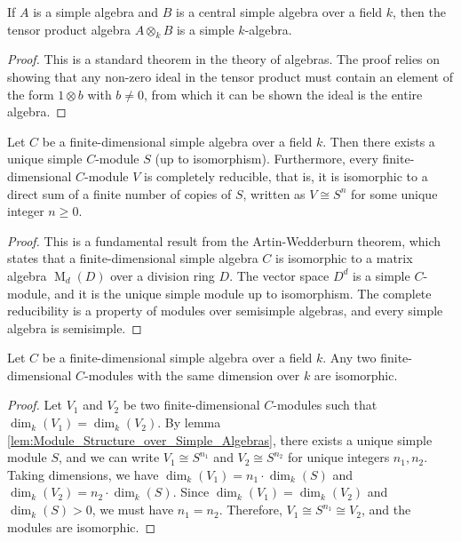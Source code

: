 \begin{lemma}
    \label{lem:Tensor_Product_is_Simple}
    If $A$ is a simple algebra and $B$ is a central simple algebra over a field $k$, then the tensor product algebra $A \otimes_k B$ is a simple $k$-algebra.
\end{lemma}

\begin{proof}
    This is a standard theorem in the theory of algebras. The proof relies on showing that any non-zero ideal in the tensor product must contain an element of the form $1 \otimes b$ with $b \neq 0$, from which it can be shown the ideal is the entire algebra.
\end{proof}

\begin{lemma}
    \label{lem:Module_Structure_over_Simple_Algebras}
    Let $C$ be a finite-dimensional simple algebra over a field $k$. Then there exists a unique simple $C$-module $S$ (up to isomorphism). Furthermore, every finite-dimensional $C$-module $V$ is completely reducible, that is, it is isomorphic to a direct sum of a finite number of copies of $S$, written as $V \cong S^n$ for some unique integer $n \ge 0$.
\end{lemma}

\begin{proof}
    This is a fundamental result from the Artin-Wedderburn theorem, which states that a finite-dimensional simple algebra $C$ is isomorphic to a matrix algebra $\operatorname{M}_d(D)$ over a division ring $D$. The vector space $D^d$ is a simple $C$-module, and it is the unique simple module up to isomorphism. The complete reducibility is a property of modules over semisimple algebras, and every simple algebra is semisimple.
\end{proof}

\begin{lemma}
    \label{lem:Isomorphism_of_Equidimensional_Modules}
    Let $C$ be a finite-dimensional simple algebra over a field $k$. Any two finite-dimensional $C$-modules with the same dimension over $k$ are isomorphic.
\end{lemma}

\begin{proof}
    Let $V_1$ and $V_2$ be two finite-dimensional $C$-modules such that $\dim_k(V_1) = \dim_k(V_2)$. By lemma \ref{lem:Module_Structure_over_Simple_Algebras}, there exists a unique simple module $S$, and we can write $V_1 \cong S^{n_1}$ and $V_2 \cong S^{n_2}$ for unique integers $n_1, n_2$.
    Taking dimensions, we have $\dim_k(V_1) = n_1 \cdot \dim_k(S)$ and $\dim_k(V_2) = n_2 \cdot \dim_k(S)$. Since $\dim_k(V_1) = \dim_k(V_2)$ and $\dim_k(S) > 0$, we must have $n_1 = n_2$. Therefore, $V_1 \cong S^{n_1} \cong V_2$, and the modules are isomorphic.
\end{proof}

